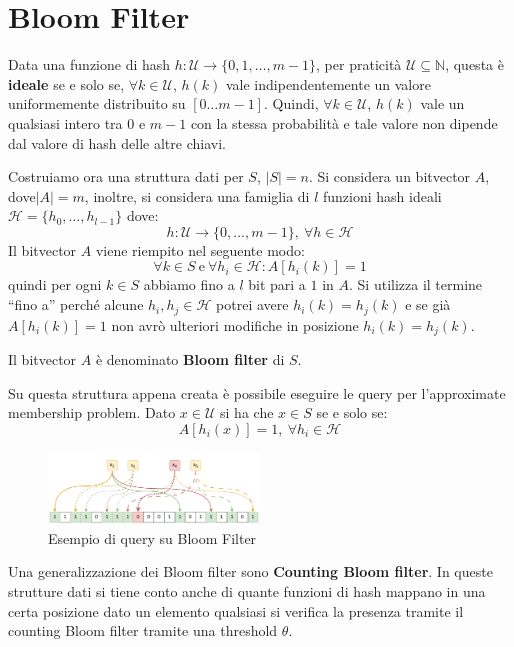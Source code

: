 \section{Bloom Filter}
\begin{definizione} 
    Data una funzione di hash $h : \mathcal{U} \to \{0, 1, \dots, m - 1\}$, per
    praticità $\mathcal{U} \subseteq \mathbb{N}$, questa è \textbf{ideale} se e
    solo se, $\forall k \in \mathcal{U}$, $h(k)$ vale indipendentemente un valore
    uniformemente distribuito su $[0 \dots m - 1]$. Quindi, $\forall k \in
        \mathcal{U}$, $h(k)$ vale un qualsiasi intero tra $0$ e $m - 1$ con la
    stessa probabilità e tale valore non dipende dal valore di hash delle altre
    chiavi.
\end{definizione}
Costruiamo ora una struttura dati per $S$, $|S| = n$. Si considera un bitvector
$A$, dove$|A| = m$, inoltre, si considera una famiglia di $l$ funzioni hash
ideali $\mathcal{H} = \{h_0, \dots, h_{l - 1}\}$ dove:
\begin{equation}
    h: \mathcal{U} \to \{0, \dots, m - 1\}, \ \forall h \in \mathcal{H}
\end{equation}
Il bitvector $A$ viene riempito nel seguente modo:
\begin{equation}
    \forall k \in S \ \text{e} \ \forall h_i \in \mathcal{H}: A[h_i(k)] = 1
\end{equation}
quindi per ogni $k \in S$ abbiamo fino a $l$ bit pari a $1$ in $A$. Si utilizza
il termine ``fino a'' perché alcune $h_i, h_j \in \mathcal{H}$ potrei avere
$h_i(k) = h_j(k)$ e se già $A[h_i(k)] = 1$ non avrò ulteriori modifiche in
posizione $h_i(k) = h_j(k)$.

Il bitvector $A$ è denominato \textbf{Bloom filter} di $S$.

Su questa struttura appena creata è possibile eseguire le query per l'approximate
membership problem. Dato $x \in \mathcal{U}$ si ha che $x \in S$ se e solo se:
\begin{equation}
    A[h_i(x)] = 1, \ \forall h_i \in \mathcal{H}
\end{equation}
\begin{figure}[!ht]
    \centering
    \includegraphics[width=0.5\textwidth]{img/hash/bloom.png}
    \caption{Esempio di query su Bloom Filter}
\end{figure}
\newpage
Una generalizzazione dei Bloom filter sono \textbf{Counting Bloom filter}. In
queste strutture dati si tiene conto anche di quante funzioni di hash mappano in
una certa posizione dato un elemento qualsiasi si verifica la presenza tramite
il counting Bloom filter tramite una threshold $\theta$.

